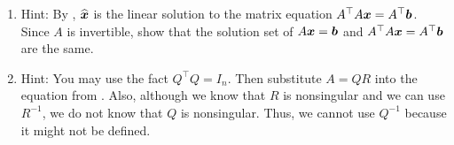 \begin{enumerate}[!HW!, start=1]
\itemspade $W=\Span\left\{\vr{1\\0\\-5},\ \vr{0\\1\\3}\right\},\quad A= \mtx{rr}{1&0\\0&1\\-5&3},\quad  A(A^\top A)^{-1}A^\top  = A\mtx{rr}{26&-15\\-15&10}^{-1}A^\top  = \dfrac{1}{35}A\mtx{rr}{10&15\\15&26}A^\top  = \dfrac{1}{35}A\mtx{rrr}{10&15&-5\\15&26&3} = \dfrac{1}{35}\mtx{rrr}{10&15&-5\\15&26&3\\-5&3&34}$ %
\itemspade $W=\Span\left\{\vr{2\\-1\\4}\right\},\quad A= \mtx{r}{2\\-1\\4} A(A^\top A)^{-1}A^\top  = A\mtx{r}{21}^{-1}A^\top  = \dfrac{1}{21}AA^\top  =\dfrac{1}{21}\mtx{rrr}{4&-2&8\\-2&1&-4\\8&-4&16}$ %

\item Hint: By , $\widehat{\boldsymbol x}$ is the linear solution to the matrix equation $A^\top A\boldsymbol x = A^\top \boldsymbol b$. Since $A$ is invertible, show that the solution set of $A\boldsymbol x=\boldsymbol b$ and $A^\top A\boldsymbol x = A^\top \boldsymbol b$ are the same. %

\item Hint: You may use the fact $Q^\top Q = I_n$. Then substitute $A=QR$ into the equation from . Also, although we know that $R$ is nonsingular and we can use $R^{-1}$, we do not know that $Q$ is nonsingular. Thus, we cannot use $Q^{-1}$ because it might not be defined.
\end{enumerate}
